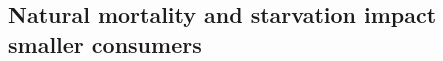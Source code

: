 \documentclass[]{rsos}%
\begin{document}
\subsection{Natural mortality and starvation impact smaller consumers}




\end{document}
